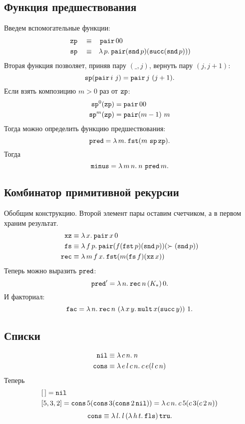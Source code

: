 \documentclass[11pt,a4paper]{article}
\begin{document}
\subsection{Функция предшествования}
Введем вспомогательные функции:
\[
\begin{aligned}
	& \zp && \equiv && \pair 0 0 \\
	& \fpsp && \equiv && \lam{p}{\pair (\snd p) (\fpsucc (\snd p)))}
\end{aligned}
\]
Вторая функция позволяет, приняв пару $ (\_, j)$, вернуть пару  $ (j, j+1)$:
 \[
	 \fpsp(\pair i~ j) = \pair j~ (j+1)
.\] 
Если взять композицию $ m > 0$ раз от $\zp$:
\[
\begin{aligned}
	\fpsp^{0} (\zp) & = \pair 0 0 \\
	\fpsp^{m}(\zp) &= \pair (m-1)~ m
\end{aligned}
\]
Тогда можно определить функцию предшествования:
\[
	\fppred = \lam{m}{\fst (m \, \fpsp \zp)}
.\] 
Тогда 
\[
	\fpminus = \lam{m\,n}{n\, \fppred m}
.\] 

\subsection{Комбинатор примитивной рекурсии}
Обобщим конструкцию. Второй элемент пары оставим счетчиком, а в первом храним результат.
\[
\begin{aligned}
	\fpxz & \equiv \lam{x}{\pair x \, 0} \\
	\fpfs & \equiv \lam {f \, p}{\pair (f (\fst p) (\snd p)) (\succ (\snd p))} \\
	\fprec & \equiv \lam{m\,f\,x}{\fst (m (\fpfs f) (\fpxz x))}
\end{aligned}
\]
Теперь можно выразить $ \fppred$:
 \[
	 \fppred' = \lam{n}{\fprec n\, (K_{*})\, 0}
.\] 
И факториал:
\[
	\fac = \lam{n}{\fprec n \, \left( \lam{x\,y}{\fpmult x (\fpsucc y)} \right) \, 1}
.\] 

\subsection{Списки}
\[
\begin{aligned}
	\nil & \equiv \lam{c\, n}{n} \\
	\cons &\equiv \lam{e\,l\,c\,n}{c \, e (l\, c\, n)}
\end{aligned}
\]
Теперь
\[
\begin{aligned}
	&[\,] = \nil \\
	&[5,3,2] = \cons 5 (\cons 3 (\cons 2 \nil)) = \lam{c\,n}{c\,5(c\,3(c\,2\,n))}
\end{aligned}
\]
\[
	\isempty \equiv \lam{l}{l \, (\lam{h\,t}{\fls}) \tru}
.\] 
\end{document}
